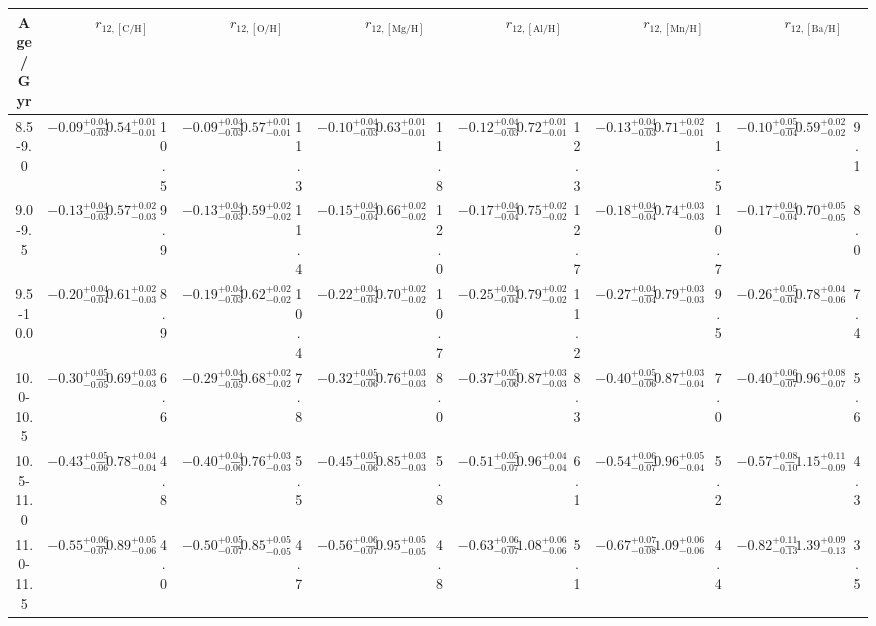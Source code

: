 \begin{tabular}{ccccccccccccccccccc}
\hline\hline
Age / Gyr & & $r_{12,\mathrm{[C/H]}}$ & & & $r_{12,\mathrm{[O/H]}}$ & & & $r_{12,\mathrm{[Mg/H]}}$ & & & $r_{12,\mathrm{[Al/H]}}$ & & & $r_{12,\mathrm{[Mn/H]}}$ & & & $r_{12,\mathrm{[Ba/H]}}$ & \\
\hline
8.5-9.0 & $-0.09_{-0.03}^{+0.04}$ & $-0.54_{-0.01}^{+0.01}$ & 10.5 & $-0.09_{-0.03}^{+0.04}$ & $-0.57_{-0.01}^{+0.01}$ & 11.3 & $-0.10_{-0.03}^{+0.04}$ & $-0.63_{-0.01}^{+0.01}$ & 11.8 & $-0.12_{-0.03}^{+0.04}$ & $-0.72_{-0.01}^{+0.01}$ & 12.3 & $-0.13_{-0.03}^{+0.04}$ & $-0.71_{-0.01}^{+0.02}$ & 11.5 & $-0.10_{-0.04}^{+0.05}$ & $-0.59_{-0.02}^{+0.02}$ & 9.1\\
9.0-9.5 & $-0.13_{-0.03}^{+0.04}$ & $-0.57_{-0.03}^{+0.02}$ & 9.9 & $-0.13_{-0.03}^{+0.04}$ & $-0.59_{-0.02}^{+0.02}$ & 11.4 & $-0.15_{-0.04}^{+0.04}$ & $-0.66_{-0.02}^{+0.02}$ & 12.0 & $-0.17_{-0.04}^{+0.04}$ & $-0.75_{-0.02}^{+0.02}$ & 12.7 & $-0.18_{-0.04}^{+0.04}$ & $-0.74_{-0.03}^{+0.03}$ & 10.7 & $-0.17_{-0.04}^{+0.04}$ & $-0.70_{-0.05}^{+0.05}$ & 8.0\\
9.5-10.0 & $-0.20_{-0.04}^{+0.04}$ & $-0.61_{-0.03}^{+0.02}$ & 8.9 & $-0.19_{-0.03}^{+0.04}$ & $-0.62_{-0.02}^{+0.02}$ & 10.4 & $-0.22_{-0.04}^{+0.04}$ & $-0.70_{-0.02}^{+0.02}$ & 10.7 & $-0.25_{-0.04}^{+0.04}$ & $-0.79_{-0.02}^{+0.02}$ & 11.2 & $-0.27_{-0.04}^{+0.04}$ & $-0.79_{-0.03}^{+0.03}$ & 9.5 & $-0.26_{-0.04}^{+0.05}$ & $-0.78_{-0.06}^{+0.04}$ & 7.4\\
10.0-10.5 & $-0.30_{-0.05}^{+0.05}$ & $-0.69_{-0.03}^{+0.03}$ & 6.6 & $-0.29_{-0.05}^{+0.04}$ & $-0.68_{-0.02}^{+0.02}$ & 7.8 & $-0.32_{-0.06}^{+0.05}$ & $-0.76_{-0.03}^{+0.03}$ & 8.0 & $-0.37_{-0.06}^{+0.05}$ & $-0.87_{-0.03}^{+0.03}$ & 8.3 & $-0.40_{-0.06}^{+0.05}$ & $-0.87_{-0.04}^{+0.03}$ & 7.0 & $-0.40_{-0.07}^{+0.06}$ & $-0.96_{-0.07}^{+0.08}$ & 5.6\\
10.5-11.0 & $-0.43_{-0.06}^{+0.05}$ & $-0.78_{-0.04}^{+0.04}$ & 4.8 & $-0.40_{-0.06}^{+0.04}$ & $-0.76_{-0.03}^{+0.03}$ & 5.5 & $-0.45_{-0.06}^{+0.05}$ & $-0.85_{-0.03}^{+0.03}$ & 5.8 & $-0.51_{-0.07}^{+0.05}$ & $-0.96_{-0.04}^{+0.04}$ & 6.1 & $-0.54_{-0.07}^{+0.06}$ & $-0.96_{-0.04}^{+0.05}$ & 5.2 & $-0.57_{-0.10}^{+0.08}$ & $-1.15_{-0.09}^{+0.11}$ & 4.3\\
11.0-11.5 & $-0.55_{-0.07}^{+0.06}$ & $-0.89_{-0.06}^{+0.05}$ & 4.0 & $-0.50_{-0.07}^{+0.05}$ & $-0.85_{-0.05}^{+0.05}$ & 4.7 & $-0.56_{-0.07}^{+0.06}$ & $-0.95_{-0.05}^{+0.05}$ & 4.8 & $-0.63_{-0.07}^{+0.06}$ & $-1.08_{-0.06}^{+0.06}$ & 5.1 & $-0.67_{-0.08}^{+0.07}$ & $-1.09_{-0.06}^{+0.06}$ & 4.4 & $-0.82_{-0.13}^{+0.11}$ & $-1.39_{-0.13}^{+0.09}$ & 3.5\\

\end{tabular}
